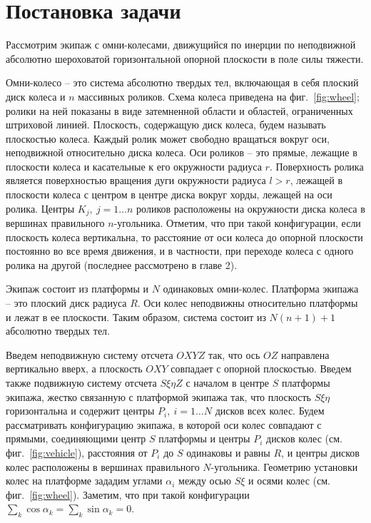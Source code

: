 \section{Постановка задачи}


Рассмотрим экипаж с омни-колесами, движущийся по инерции по неподвижной абсолютно шероховатой горизонтальной опорной плоскости в поле силы тяжести. 

Омни-колесо -- это система абсолютно твердых тел, включающая в себя плоский диск колеса и $n$ массивных роликов. Схема колеса приведена на фиг.~\ref{fig:wheel}; ролики на ней показаны в виде затемненной области и областей, ограниченных штриховой линией. Плоскость, содержащую диск колеса, будем называть плоскостью колеса. Каждый ролик может свободно вращаться вокруг оси, неподвижной относительно диска колеса. Оси роликов -- это прямые, лежащие в плоскости колеса и касательные к его окружности радиуса $r$. Поверхность ролика является поверхностью вращения дуги окружности радиуса $l > r$, лежащей в плоскости колеса с центром в центре диска вокруг хорды, лежащей на оси ролика. Центры $K_j,\ j = 1 \ldots n$ роликов расположены на окружности диска колеса в вершинах правильного $n$-угольника. Отметим, что при такой конфигурации, если плоскость колеса вертикальна, то расстояние от оси колеса до опорной плоскости постоянно во все время движения, и в частности, при переходе колеса с одного ролика на другой (последнее рассмотрено в главе 2).

Экипаж состоит из платформы и $N$ одинаковых омни-колес. Платформа экипажа -- это плоский диск радиуса $R$. Оси колес неподвижны относительно платформы и лежат в ее плоскости. Таким образом, система состоит из $N(n+1) + 1$ абсолютно твердых тел.

Введем неподвижную систему отсчета $OXYZ$ так, что ось $OZ$ направлена вертикально вверх, а плоскость $OXY$ совпадает с опорной плоскостью. Введем также подвижную систему отсчета $S\xi\eta Z$ с началом в центре $S$ платформы экипажа, жестко связанную с платформой экипажа так, что плоскость $S\xi\eta$ горизонтальна и содержит центры $P_i,\ i = 1 \ldots N$ дисков всех колес. Будем рассматривать конфигурацию экипажа, в которой оси колес совпадают с прямыми, соединяющими центр $S$ платформы и центры $P_i$ дисков колес (см. фиг.~\ref{fig:vehicle}), расстояния от $P_i$ до $S$ одинаковы и равны $R$, и центры дисков колес расположены в вершинах правильного $N$-угольника. Геометрию установки колес на платформе зададим углами $\alpha_i$ между осью $S\xi$ и осями колес (см. фиг.~\ref{fig:wheel}). Заметим, что при такой конфигурации $\sum\limits_{k} \cos\alpha_k = \sum\limits_{k}\sin\alpha_k = 0$.

